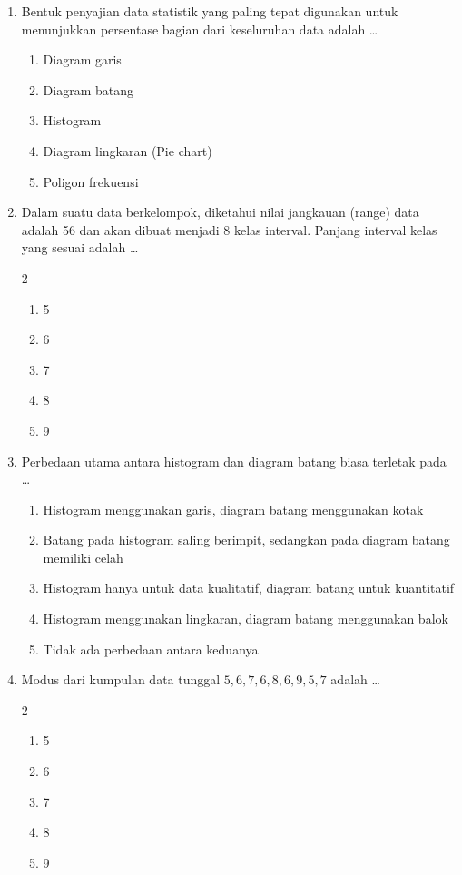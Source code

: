\documentclass[12pt,a4paper]{article}
\begin{document}
\begin{enumerate}[itemsep=2ex]
    \item Bentuk penyajian data statistik yang paling tepat digunakan untuk menunjukkan persentase bagian dari keseluruhan data adalah \dots
    \begin{enumerate}[label=\Alph*.]
        \item Diagram garis
        \item Diagram batang
        \item Histogram
        \item Diagram lingkaran (Pie chart)
        \item Poligon frekuensi
    \end{enumerate}

    \item Dalam suatu data berkelompok, diketahui nilai jangkauan (range) data adalah 56 dan akan dibuat menjadi 8 kelas interval. Panjang interval kelas yang sesuai adalah \dots
    \begin{multicols}{2}
    \begin{enumerate}[label=\Alph*.]
        \item 5
        \item 6
        \item 7
        \item 8
        \item 9
    \end{enumerate}
    \end{multicols}

    \item Perbedaan utama antara histogram dan diagram batang biasa terletak pada \dots
    \begin{enumerate}[label=\Alph*.]
        \item Histogram menggunakan garis, diagram batang menggunakan kotak
        \item Batang pada histogram saling berimpit, sedangkan pada diagram batang memiliki celah
        \item Histogram hanya untuk data kualitatif, diagram batang untuk kuantitatif
        \item Histogram menggunakan lingkaran, diagram batang menggunakan balok
        \item Tidak ada perbedaan antara keduanya
    \end{enumerate}

    \item Modus dari kumpulan data tunggal $5, 6, 7, 6, 8, 6, 9, 5, 7$ adalah \dots
    \begin{multicols}{2}
    \begin{enumerate}[label=\Alph*.]
        \item 5
        \item 6
        \item 7
        \item 8
        \item 9
    \end{enumerate}
    \end{multicols}


\end{enumerate}
\end{document}

